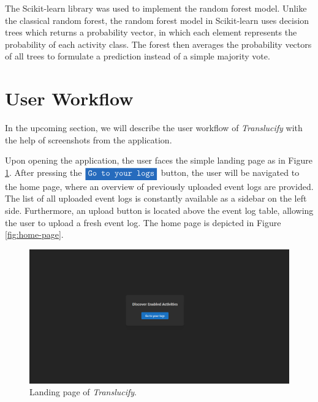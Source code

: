 The Scikit-learn library was used to implement the random forest model. Unlike the classical random forest, the random forest model in Scikit-learn uses decision trees which returns a probability vector, in which each element represents the probability of each activity class. The forest then averages the probability vectors of all trees to formulate a prediction instead of a simple majority vote.

\section{User Workflow}

In the upcoming section, we will describe the user workflow of \emph{Translucify} with the help of screenshots from the application.

Upon opening the application, the user faces the simple landing page as in Figure \ref{fig:landing-page}. After pressing the $\colorbox{NavyBlue}{\textcolor{white}{\texttt{Go to your logs}}}$ button, the user will be navigated to the home page, where an overview of previously uploaded event logs are provided. The list of all uploaded event logs is constantly available as a sidebar on the left side. Furthermore, an upload button is located above the event log table, allowing the user to upload a fresh event log. The home page is depicted in Figure \ref{fig:home-page}.

\begin{figure}
    \centering
    \includegraphics[width=\textwidth]{figures/screenshots/landing.png}
    \caption{Landing page of \emph{Translucify}.}
    \label{fig:landing-page}
\end{figure}


